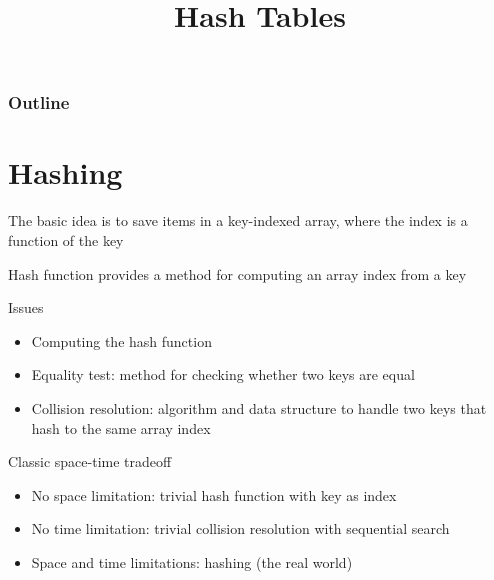 \documentclass[8pt,a4paper,compress]{beamer}
\title{Hash Tables}
\date{}
\begin{document}
\begin{frame}
\vfill
\titlepage
\end{frame}

\begin{frame}
\frametitle{Outline}
\tableofcontents
\end{frame}

\section{Hashing}
\begin{frame}[fragile]
\pause

The basic idea is to save items in a key-indexed array, where the index is a function of the key

\pause
\bigskip

Hash function provides a method for computing an array index from a key

\pause
\bigskip

Issues
\begin{itemize}
\item Computing the hash function

\item Equality test: method for checking whether two keys are equal

\item Collision resolution: algorithm and data structure to handle two keys that hash to the same array index
\end{itemize}

\pause
\bigskip

Classic space-time tradeoff
\begin{itemize}
\item No space limitation: trivial hash function with key as index

\item No time limitation: trivial collision resolution with sequential search

\item Space and time limitations: hashing (the real world)
\end{itemize}
\end{frame}
\end{document}
